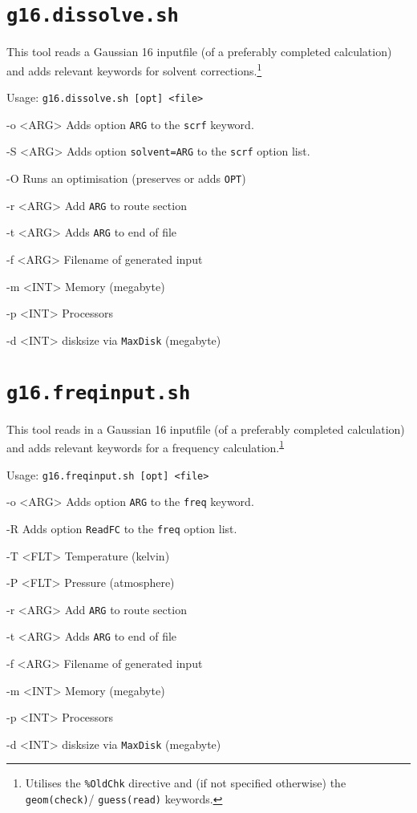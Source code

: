 \documentclass[final, a4paper, columns=3, margin=1.0cm, 10pt]{refcard}
\newcommand*{\footnoteref}[1]{\textsuperscript{\ref{#1}}}
\begin{document}
\section{\texttt{g16.dissolve.sh}}

This tool reads a Gaussian 16 inputfile (of a preferably completed calculation)
and adds relevant keywords for solvent corrections.\footnote{\label{fn:oldchk}%
Utilises the \texttt{\%OldChk} directive and (if not specified otherwise) 
the \texttt{geom(check)}/ \texttt{guess(read)} keywords.}

Usage: \texttt{g16.dissolve.sh [opt] <file>}

\begin{refcardlist}[labelfont=\ttfamily]
  \item[-o <ARG>] Adds option \texttt{ARG} to the \texttt{scrf} keyword.
  \item[-S <ARG>] Adds option \texttt{solvent=ARG} to the \texttt{scrf} option list.
  \item[-O      ] Runs an optimisation (preserves or adds \texttt{OPT})
  \item[-r <ARG>] Add \texttt{ARG} to route section
  \item[-t <ARG>] Adds \texttt{ARG} to end of file
  \item[-f <ARG>] Filename of generated input
  \item[-m <INT>] Memory (megabyte)
  \item[-p <INT>] Processors
  \item[-d <INT>] disksize via \texttt{MaxDisk} (megabyte)
\end{refcardlist}

\section{\texttt{g16.freqinput.sh}}

This tool reads in a Gaussian 16 inputfile (of a preferably completed calculation)
and adds relevant keywords for a frequency calculation.\footnoteref{fn:oldchk}

Usage: \texttt{g16.freqinput.sh [opt] <file>}

\begin{refcardlist}[labelfont=\ttfamily]
  \item[-o <ARG>] Adds option \texttt{ARG} to the \texttt{freq} keyword.
  \item[-R      ] Adds option \texttt{ReadFC} to the \texttt{freq} option list.
  \item[-T <FLT>] Temperature (kelvin)
  \item[-P <FLT>] Pressure (atmosphere)
  \item[-r <ARG>] Add \texttt{ARG} to route section
  \item[-t <ARG>] Adds \texttt{ARG} to end of file
  \item[-f <ARG>] Filename of generated input
  \item[-m <INT>] Memory (megabyte)
  \item[-p <INT>] Processors
  \item[-d <INT>] disksize via \texttt{MaxDisk} (megabyte)
\end{refcardlist}
\end{document}
